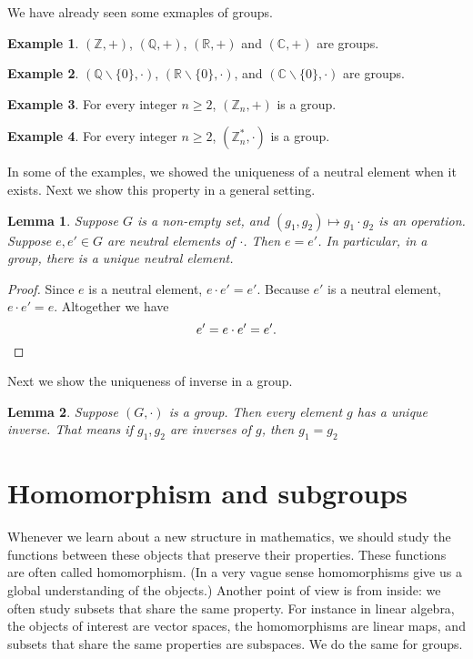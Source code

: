 \documentclass{article}
\theoremstyle{plain}
\newtheorem{lemma}{Lemma}
\theoremstyle{definition}
\newtheorem*{example}{Example}
\newcommand{\FR}{\mathbb{R}}
\begin{document}
We have already seen some exmaples of groups.
\begin{example}
    $(\mathbb{Z},+)$, $(\mathbb{Q},+)$, $(\FR,+)$ and $(\mathbb{C},+)$ are groups.
\end{example}

\begin{example}
    $(\mathbb{Q}\backslash\{0\},\cdot)$, $(\FR\backslash\{0\},\cdot)$, and 
    $(\mathbb{C}\backslash\{0\},\cdot)$ are groups.
\end{example}

\begin{example}
    For every integer $n\geq 2$, $(\mathbb{Z}_n,+)$ is a group.
\end{example}

\begin{example}
    For every integer $n\geq 2$, $(\mathbb{Z}_n^*,\cdot)$ is a group.
\end{example}

In some of the examples, we showed the uniqueness
of a neutral element when it exists. Next we show
this property in a general setting.

\begin{lemma}
    Suppose $G$ is a non-empty set, and $(g_1,g_2)\mapsto g_1\cdot g_2$
    is an operation. Suppose $e,e'\in G$ are neutral
    elements of $\cdot$. Then $e=e'$. In particular,
    in a group, there is a unique neutral element.
\end{lemma}

\begin{proof}
    Since $e$ is a neutral element, $e\cdot e'=e'$.
    Because $e'$ is a neutral element, $e\cdot e'=e$.
    Altogether we have 
    \[e'=e\cdot e'=e'.\qedhere\]
\end{proof}

Next we show the uniqueness of inverse in a group.

\begin{lemma}
    Suppose $(G,\cdot)$ is a group. Then every element
    $g$ has a unique inverse. That means if $g_1,g_2$
    are inverses of $g$, then $g_1=g_2$
\end{lemma}


\section{Homomorphism and subgroups}

Whenever we learn about a new structure in mathematics, we 
should study the functions between these objects that preserve
their properties. These functions are often called homomorphism.
(In a very vague sense homomorphisms give us a global understanding
of the objects.) Another point of view is from inside:
we often study subsets that share the same property. For
instance in linear algebra, the objects of interest are vector
spaces, the homomorphisms are linear maps, and subsets that
share the same properties are subspaces. We do the same for groups.
\end{document}

